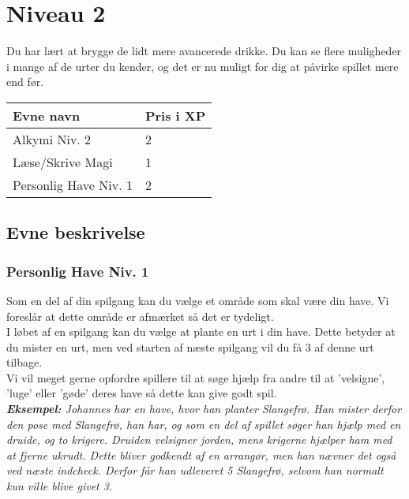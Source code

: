 \chapter{Niveau 2}
Du har lært at brygge de lidt mere avancerede drikke. Du kan se flere muligheder i mange af de urter du kender, og det er nu muligt for dig at påvirke spillet mere end før.\\
\begin{table}[H]
    \centering
    \begin{tabular}{|p{}|p{}|}
    \rowcolor{cerulean!80}\hline
        Evne navn & Pris i XP \\\hline
         Alkymi Niv. 2 & 2 \\\hline
         Læse/Skrive Magi & 1 \\\hline
         Personlig Have Niv. 1 & 2 \\
         \hline
    \end{tabular}
\end{table}
\section{Evne beskrivelse}





\subsection{Personlig Have Niv. 1}
Som en del af din spilgang kan du vælge et område som skal være din have. Vi foreslår at dette område er afmærket så det er tydeligt.\\
I løbet af en spilgang kan du vælge at plante en urt i din have. Dette betyder at du mister en urt, men ved starten af næste spilgang vil du få 3 af denne urt tilbage.\\
Vi vil meget gerne opfordre spillere til at søge hjælp fra andre til at 'velsigne', 'luge' eller 'gøde' deres have så dette kan give godt spil.\\
\textit{\textbf{Eksempel:} Johannes har en have, hvor han planter Slangefrø. Han mister derfor den pose med Slangefrø, han har, og som en del af spillet søger han hjælp med en druide, og to krigere. Druiden velsigner jorden, mens krigerne hjælper ham med at fjerne ukrudt. Dette bliver godkendt af en arrangør, men han nævner det også ved næste indcheck. Derfor får han udleveret 5 Slangefrø, selvom han normalt kun ville blive givet 3.}
\\
